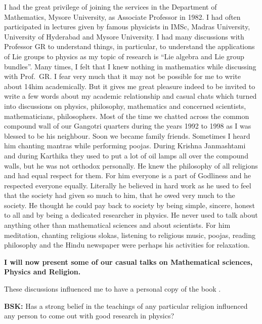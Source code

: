 I had the great privilege of joining the services in the Department of Mathematics, Mysore University, as Associate Professor in 1982. I had often participated in lectures given by famous physicists in IMSc, Madras University, University of Hyderabad and Mysore University. I had many discussions with Professor GR to understand things, in particular, to understand the applications of Lie groups to physics as my topic of research is “Lie algebra and Lie group bundles”. Many times, I felt that I knew nothing in mathematics while discussing with Prof.\ GR. I fear very much that it may not be possible for me to write about 14him academically. But it gives me great pleasure indeed to be invited to write a few words about my academic relationship and casual chats which turned into discussions on physics, philosophy, mathematics and concerned scientists, mathematicians, philosophers. Most of the time we chatted across the common compound wall of our Gangotri quarters during the years 1992 to 1998 as I was blessed to be his neighbour. Soon we became family friends. Sometimes I heard him chanting mantras while performing poojas. During Krishna Janmashtami and during Karthika they used to put a lot of oil lamps all over the compound walls, but he was not orthodox personally. He knew the philosophy of all religions and had equal respect for them. For him everyone is a part of Godliness and he respected everyone equally. Literally he believed in hard work as he used to feel that the society had given so much to him, that he owed very much to the society. He thought he could pay back to society by being simple, sincere, honest to all and by being a dedicated researcher in physics. He never used to talk about anything other than mathematical sciences and about scientists. For him meditation, chanting religious slokas, listening to religious music, poojas, reading philosophy and the Hindu newspaper were perhaps his activities for relaxation.

\textbf{I will now present some of our casual talks on Mathematical sciences, Physics and Religion.}

These discussions influenced me to have a personal copy of the book \cite{chap17-key04MJL}.  

\textbf{BSK:} Has a strong belief in the teachings of any particular religion influenced any person to come out with good research in physics?

